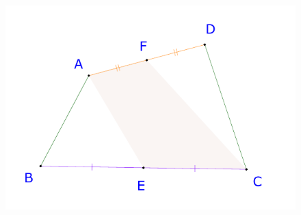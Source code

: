 \begin{multicols}{2}
		\begin{figure}[H]
		\vspace*{-10pt}
		\centering
		\captionsetup{labelformat= empty, justification=centering}
		\includegraphics[width= 1\linewidth]{23-24-s3-i-p2.pdf}
		\vspace*{-20pt}
	\end{figure}


\end{multicols}
